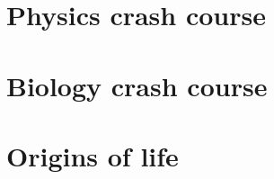 \documentclass[DIV=calc, paper=a4, fontsize=12pt]{scrartcl}	 %
\begin{document}
\begin{multicols}{2}

\end{multicols} \noindent\makebox[\linewidth]{\rule{\textwidth}{0.4pt}}

\section{Physics crash course}

\begin{multicols}{2}









\end{multicols} \noindent\makebox[\linewidth]{\rule{\textwidth}{0.4pt}}


\section{Biology crash course}

\begin{multicols}{2}



\end{multicols} \noindent\makebox[\linewidth]{\rule{\textwidth}{0.4pt}}


\section{Origins of life}

\begin{multicols}{2}



\end{multicols} \noindent\makebox[\linewidth]{\rule{\textwidth}{0.4pt}}
\end{document}
